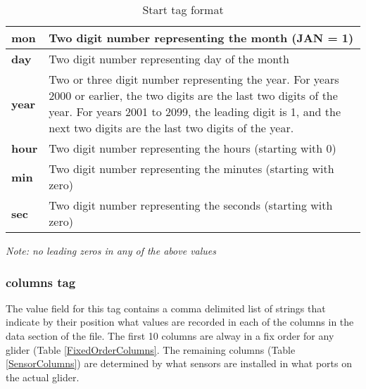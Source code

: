 \documentclass[12pt,english,twoside]{book}
\providecommand{\tabularnewline}{\\}
\begin{document}
%
\begin{table}
\begin{centering}\begin{tabular}{|l|p{4.5in}|}
\hline 
\textbf{mon} &
Two digit number representing the month (JAN = 1) \tabularnewline
\hline 
\textbf{day} &
Two digit number representing day of the month \tabularnewline
\hline 
\textbf{year} &
Two or three digit number representing the year. For years 2000 or
earlier, the two digits are the last two digits of the year. For years
2001 to 2099, the leading digit is 1, and the next two digits are
the last two digits of the year. \tabularnewline
\hline 
\textbf{hour} &
Two digit number representing the hours (starting with 0) \tabularnewline
\hline 
\textbf{min} &
Two digit number representing the minutes (starting with zero) \tabularnewline
\hline 
\textbf{sec} &
Two digit number representing the seconds (starting with zero) \tabularnewline
\hline
\end{tabular}\par\end{centering}


\caption{Start tag format}

\label{StartTag} 
\end{table}


\textit{Note: no leading zeros in any of the above values}


\subsubsection{columns tag}

The value field for this tag contains a comma delimited list of strings
that indicate by their position what values are recorded in each of
the columns in the data section of the file. The first 10 columns
are alway in a fix order for any glider (Table \ref{FixedOrderColumns}.
The remaining columns (Table \ref{SensorColumns}) are determined
by what sensors are installed in what ports on the actual glider.
\end{document}
